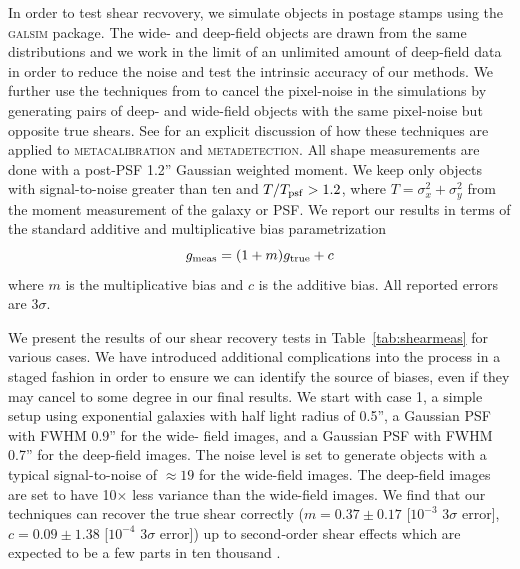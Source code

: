 \documentclass[twocolumn]{openjournal}
\makeatletter
\newcommand{\mdet}{\textsc{metadetection}\@\xspace}
\newcommand{\mcal}{\textsc{metacalibration}\@\xspace}
\newcommand{\galsim}{\textsc{galsim}\@\xspace}
\makeatother
\begin{document}
In order to test shear recvovery, we simulate objects in postage stamps using the
\galsim package. The wide- and deep-field objects are drawn from the same distributions
and we work in the limit of an unlimited amount of deep-field data in order to reduce
the noise and test the intrinsic accuracy of our methods. We further use the techniques
from \citet{pujol2019} to cancel the pixel-noise in the simulations by generating pairs
of deep- and wide-field objects with the same pixel-noise but opposite true shears. See
\citet{SheldonMdet2020} for an explicit discussion of how these techniques are applied
to \mcal and \mdet. All shape measurements are done with a post-PSF 1.2'' Gaussian
weighted moment. We keep only objects with signal-to-noise greater than ten and
$T/T_{\rm psf} > 1.2$, where $T=\sigma_{x}^2 + \sigma_{y}^2$ from the moment measurement
of the galaxy or PSF. We report our results in terms of the standard additive and
multiplicative bias parametrization \citep[see, e.g.,][]{heymans2006}
\begin{equation*}
g_{\rm meas} = (1+m)g_{\rm true} + c
\end{equation*}
where $m$ is the multiplicative bias and $c$ is the additive bias. All reported errors
are $3\sigma$.

We present the results of our shear recovery tests in Table~\ref{tab:shearmeas} for
various cases. We have introduced additional complications into the process in a staged
fashion in order to ensure we can identify the source of biases, even if
they may cancel to some degree in our final results. We start with
case 1, a simple setup using exponential galaxies with half light radius of 0.5'', a
Gaussian PSF with FWHM 0.9'' for the wide- field images, and a Gaussian PSF with FWHM
0.7'' for the deep-field images. The noise level is set to generate objects with a
typical signal-to-noise of $\approx19$ for the wide-field images. The deep-field images
are set to have 10$\times$ less variance than the wide-field images. We find that our
techniques can recover the true shear correctly ($m=0.37\pm0.17$ [$10^{-3}$ $3\sigma$
error], $c=0.09\pm1.38$ [$10^{-4}$ $3\sigma$ error]) up to second-order shear effects
which are expected to be a few parts in ten thousand
\citep{SheldonMcal2017,SheldonMdet2020}.
\end{document}
